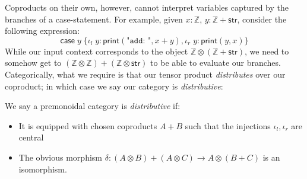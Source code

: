 \documentclass[acmsmall,screen,review]{acmart}
\newcommand{\mbb}[1]{\ensuremath{\mathbb{#1}}}
\newcommand{\ms}[1]{\ensuremath{\mathsf{#1}}}
\newcommand{\lto}{:}
\newcommand{\linl}[1]{\iota_l\;{#1}}
\newcommand{\linr}[1]{\iota_r\;{#1}}
\newcommand{\caseexpr}[5]{\ms{case}\;#1\;\{\linl{#2} \lto #3, \linr{#4} \lto #5\}}
\begin{document}
Coproducts on their own, however, cannot interpret variables captured by the branches of a
case-statement. For example, given $x : \mbb{Z}$, $y : \mbb{Z} + \ms{str}$, consider the following
expression:
$$
\caseexpr{y}{y}{\ms{print}(\texttt{"add: "}, x + y)}{y}{\ms{print}(y, x)}
$$
While our input context corresponds to the object $\mbb{Z} \otimes (\mbb{Z} + \ms{str})$, we need to
somehow get to $(\mbb{Z} \otimes \mbb{Z}) + (\mbb{Z} \otimes \ms{str})$ to be able to evaluate our
branches. Categorically, what we require is that our tensor product \emph{distributes} over our
coproduct; in which case we say our category is \emph{distributive}:
\begin{definition}
  We say a premonoidal category is \emph{distributive} if:
  \begin{itemize}
    \item It is equipped with chosen coproducts $A + B$ such that the injections $\iota_l, \iota_r$
    are central
    \item The obvious morphism $\delta : (A \otimes B) + (A \otimes C) \to A \otimes (B + C)$ is an
    isomorphism.
  \end{itemize}
\end{definition}
\end{document}
